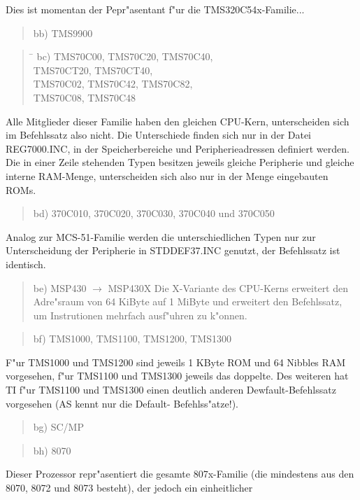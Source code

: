 \documentclass[12pt,a4paper,twoside]{report}
\begin{document}
{Dies ist momentan der Pepr"asentant f"ur die TMS320C54x-Familie...
\begin{quote}
bb) TMS9900
\end{quote}
\begin{quote}
\begin{tabbing}
\hspace{0.7cm} \= \kill
bc) \> TMS70C00, TMS70C20, TMS70C40, \\
    \> TMS70CT20, TMS70CT40, \\
    \> TMS70C02, TMS70C42, TMS70C82, \\
    \> TMS70C08, TMS70C48 \\
\end{tabbing}
\end{quote}
Alle Mitglieder dieser Familie haben den gleichen CPU-Kern, 
unterscheiden sich im Befehlssatz also nicht.  Die Unterschiede
finden sich nur in der Datei REG7000.INC, in der Speicherbereiche
und Peripherieadressen definiert werden.  Die in einer Zeile
stehenden  Typen besitzen jeweils gleiche Peripherie und gleiche
interne RAM-Menge, unterscheiden sich also nur in der Menge
eingebauten ROMs.
\begin{quote}
bd) 370C010, 370C020, 370C030, 370C040 und 370C050
\end{quote}
Analog zur MCS-51-Familie werden die unterschiedlichen Typen nur
zur Unterscheidung der Peripherie in STDDEF37.INC genutzt, der
Befehlssatz ist identisch.
\begin{quote}
be) MSP430 $\rightarrow$ MSP430X
Die X-Variante des CPU-Kerns erweitert den Adre"sraum von 64
KiByte auf 1 MiByte und erweitert den Befehlssatz, um
Instrutionen mehrfach ausf"uhren zu k"onnen.
\end{quote}
\begin{quote}
bf) TMS1000, TMS1100, TMS1200, TMS1300
\end{quote}
F"ur TMS1000 und TMS1200 sind jeweils 1 KByte ROM und 64 Nibbles
RAM vorgesehen, f"ur TMS1100 und TMS1300 jeweils das doppelte.  Des
weiteren hat TI f"ur TMS1100 und TMS1300 einen deutlich anderen 
Dewfault-Befehlssatz vorgesehen (AS kennt nur die Default-
Befehlss"atze!).
\begin{quote}
bg) SC/MP
\end{quote}
\begin{quote}
bh) 8070
\end{quote}
Dieser Prozessor repr"asentiert die gesamte 807x-Familie (die mindestens
aus den 8070, 8072 und 8073 besteht), der jedoch ein einheitlicher
}
\end{document}
